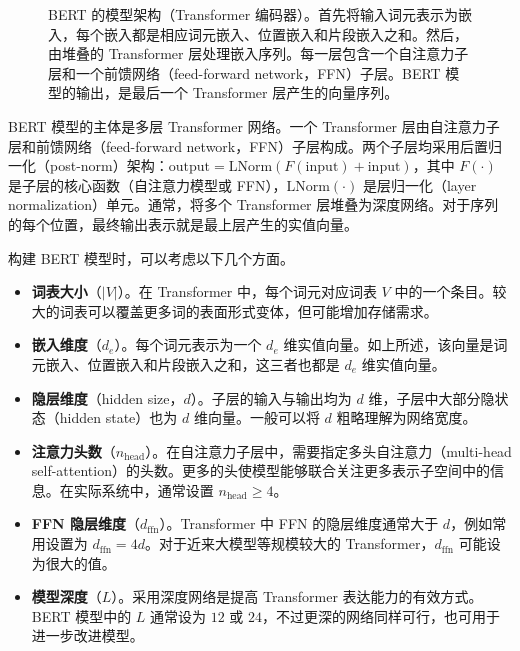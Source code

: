 \begin{figure}[!t]
\centering

\caption{BERT 的模型架构（Transformer 编码器）。首先将输入词元表示为嵌入，每个嵌入都是相应词元嵌入、位置嵌入和片段嵌入之和。然后，由堆叠的 Transformer 层处理嵌入序列。每一层包含一个自注意力子层和一个前馈网络（feed-forward network，FFN）子层。BERT 模型的输出，是最后一个 Transformer 层产生的向量序列。}
\label{fig:bert-architecture}
\end{figure}

BERT 模型的主体是多层 Transformer 网络。一个 Transformer 层由自注意力子层和前馈网络（feed-forward network，FFN）子层构成。两个子层均采用后置归一化（post-norm）架构：$\mathrm{output} = \mathrm{LNorm}(F(\mathrm{input}) + \mathrm{input})$，其中 $F(\cdot)$ 是子层的核心函数（自注意力模型或 FFN），$\mathrm{LNorm}(\cdot)$ 是层归一化（layer normalization）单元。通常，将多个 Transformer 层堆叠为深度网络。对于序列的每个位置，最终输出表示就是最上层产生的实值向量。

构建 BERT 模型时，可以考虑以下几个方面。

\begin{itemize}
\item \vspace{0.5em} \textbf{词表大小}（$|V|$）。在 Transformer 中，每个词元对应词表 $V$ 中的一个条目。较大的词表可以覆盖更多词的表面形式变体，但可能增加存储需求。
\item \vspace{0.3em} \textbf{嵌入维度}（$d_e$）。每个词元表示为一个 $d_e$ 维实值向量。如上所述，该向量是词元嵌入、位置嵌入和片段嵌入之和，这三者也都是 $d_e$ 维实值向量。
\item \vspace{0.3em} \textbf{隐层维度}（hidden size，$d$）。子层的输入与输出均为 $d$ 维，子层中大部分隐状态（hidden state）也为 $d$ 维向量。一般可以将 $d$ 粗略理解为网络宽度。
\item \vspace{0.3em} \textbf{注意力头数}（$n_{\mathrm{head}}$）。在自注意力子层中，需要指定多头自注意力（multi-head self-attention）的头数。更多的头使模型能够联合关注更多表示子空间中的信息。在实际系统中，通常设置 $n_{\mathrm{head}} \ge 4$。
\item \vspace{0.3em} \textbf{FFN 隐层维度}（$d_{\textrm{ffn}}$）。Transformer 中 FFN 的隐层维度通常大于 $d$，例如常用设置为 $d_{\textrm{ffn}} = 4 d$。对于近来大模型等规模较大的 Transformer，$d_{\textrm{ffn}}$ 可能设为很大的值。
\item \vspace{0.3em} \textbf{模型深度}（$L$）。采用深度网络是提高 Transformer 表达能力的有效方式。BERT 模型中的 $L$ 通常设为 $12$ 或 $24$，不过更深的网络同样可行，也可用于进一步改进模型。
\end{itemize}
\vspace{0.5em}

